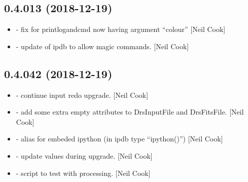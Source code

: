 \documentclass[a4paper,10pt,english]{report}
\begin{document}
\subsection{0.4.013 (2018-12-19)}
\label{\detokenize{misc/changelog:id224}}\begin{itemize}
\item {} 
 - fix for printlogandcmd now having argument “colour”
{[}Neil Cook{]}

\item {} 
 - update of ipdb to allow magic commands. {[}Neil Cook{]}

\end{itemize}


\subsection{0.4.042 (2018-12-19)}
\label{\detokenize{misc/changelog:id225}}\begin{itemize}
\item {} 
 - continue input redo upgrade. {[}Neil Cook{]}

\item {} 
 - add some extra empty attributes to DrsInputFile and
DrsFitsFile. {[}Neil Cook{]}

\item {} 
 - alias for embeded ipython (in ipdb type “ipython()”)
{[}Neil Cook{]}

\item {} 
 - update values during  upgrade. {[}Neil
Cook{]}

\item {} 
 - script to test  with processing. {[}Neil
Cook{]}

\end{itemize}
\end{document}
